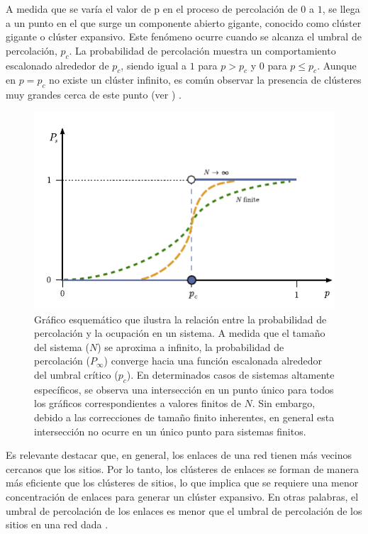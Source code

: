 A medida que se varía el valor de p en el proceso de percolación de $0$ a $1$, se llega a un punto en el que surge un componente abierto gigante, conocido como clúster gigante o clúster expansivo. Este fenómeno ocurre cuando se alcanza el umbral de percolación, $p_c$. La probabilidad de percolación muestra un comportamiento escalonado alrededor de $p_c$, siendo igual a $1$ para $p > p_c$ y 0 para $p \leq p_c$. Aunque en $p = p_c$ no existe un clúster infinito, es común observar la presencia de clústeres muy grandes cerca de este punto (ver ) \cite{aizenman_number_1997}.


 \begin{figure}[ht]
	\centering\includegraphics[width=\imsize]{probabilidad}
	\caption[Gráfico esquemático que ilustra la relación entre la probabilidad de percolación y la ocupación en un sistema]{Gráfico esquemático que ilustra la relación entre la probabilidad de percolación y la ocupación en un sistema. A medida que el tamaño del sistema ($N$) se aproxima a infinito, la probabilidad de percolación ($P_\infty$) converge hacia una función escalonada alrededor del umbral crítico ($p_c$). En determinados casos de sistemas altamente específicos, se observa una intersección en un punto único para todos los gráficos correspondientes a valores finitos de $N$. Sin embargo, debido a las correcciones de tamaño finito inherentes, en general esta intersección no ocurre en un único punto para sistemas finitos.}\label{fig:probabilidadinf}
\end{figure}

Es relevante destacar que, en general, los enlaces de una red tienen más vecinos cercanos que los sitios. Por lo tanto, los clústeres de enlaces se forman de manera más eficiente que los clústeres de sitios, lo que implica que se requiere una menor concentración de enlaces para generar un clúster expansivo. En otras palabras, el umbral de percolación de los enlaces es menor que el umbral de percolación de los sitios en una red dada \cite{bunde_fractals_2012}.



